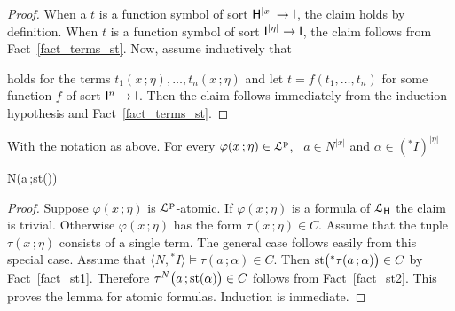 \documentclass[10pt,oneside]{amsproc}
\begin{document}
\begin{proof}
  When a $t$ is a function symbol of sort  ${\sf H}^{|x|}\to {\sf I}$, the claim holds by definition.
  When $t$ is a function symbol of sort ${\sf I}^{|\eta|}\to {\sf I}$, the claim follows from Fact~\ref{fact_terms_st}.
  Now, assume inductively that 


  holds for the terms $t_1(x\,;\eta),\dots,t_n(x\,;\eta)$ and let $t=f(t_1,\dots,t_n)$ for some function $f$ of sort ${\sf I}^n\to {\sf I}$.
  Then the claim follows immediately from the induction hypothesis and Fact~\ref{fact_terms_st}.
\end{proof}


\begin{lemma}\label{lem_st}
  With the notation as above.
  For every $\varphi(x\,;\eta)\in{\EuScript L}^{\rm p}$, \  $a\in N^{|x|}$ and $\alpha\in({}^*\!\!I)^{|\eta|}$ 
  
  {\Rightarrow}
  {N\models\varphi\big(a\,;{\rm st}(\alpha)\big)}
\end{lemma}

\begin{proof}
  Suppose $\varphi(x\,;\eta)$ is ${\EuScript L}^{\rm p}$-atomic.
  If $\varphi(x\,;\eta)$ is a formula of ${\EuScript L}_{\sf H}$ the claim is trivial. 
  Otherwise $\varphi(x\,;\eta)$ has the form $\tau(x\,;\eta)\in C$.
  Assume that the tuple $\tau(x\,;\eta)$ consists of a single term.
  The general case follows easily from this special case. 
  Assume that $\langle N,{}^*\!\!I\rangle\models \tau(a\,;\alpha)\in C$.
  Then ${\rm st}\big({}^*\tau(a\,;\alpha)\big)\in C$ by Fact~\ref{fact_st1}.
  Therefore $\tau^N\big(a\,;{\rm st}(\alpha)\big)\in C$ follows from Fact~\ref{fact_st2}.
  This proves the lemma for atomic formulas.
  Induction is immediate. 
\end{proof}
\end{document}
